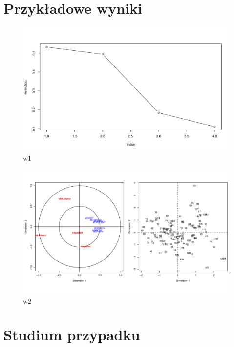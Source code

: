 \documentclass[polish,]{book}
\begin{document}
\hypertarget{part_55}{%
\section{Przykładowe wyniki}\label{part_55}}

\begin{figure}

{\centering \includegraphics[width=1\linewidth]{w1} 

}

\caption{w1}\label{fig:w1}
\end{figure}
\begin{figure}

{\centering \includegraphics[width=1\linewidth]{w2} 

}

\caption{w2}\label{fig:w2}
\end{figure}

\hypertarget{part_56}{%
\section{Studium przypadku}\label{part_56}}
\end{document}
